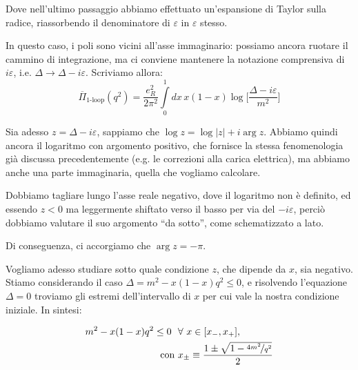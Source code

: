 \documentclass[../main.tex]{subfiles}
\begin{document}
Dove nell'ultimo passaggio abbiamo effettuato un'espansione di Taylor sulla radice, riassorbendo il denominatore di $\varepsilon$ in $\varepsilon$ stesso.

In questo caso, i poli sono vicini all'asse immaginario: possiamo ancora ruotare il cammino di integrazione, ma ci conviene mantenere la notazione comprensiva di \(i\varepsilon\), i.e. \(\Delta \rightarrow \Delta - i\varepsilon\). Scriviamo allora:
\[
\overline\Pi_\text{1-loop}(q^2) = \frac{e_R^2}{2\pi^2}\int\limits_0^1 dx \,x(1-x)\log{\bigg[\frac{\Delta - i\varepsilon}{m^2}\bigg]}
\]

Sia adesso \( z = \Delta - i\varepsilon \), sappiamo che \(\log z = \log|z| + i\arg z\). Abbiamo quindi ancora il logaritmo con argomento positivo, che fornisce la stessa fenomenologia già discussa precedentemente (e.g. le correzioni alla carica elettrica), ma abbiamo anche una parte immaginaria, quella che vogliamo calcolare.

Dobbiamo tagliare lungo l'asse reale negativo, dove il logaritmo non è definito, ed essendo \(z < 0\) ma leggermente shiftato verso il basso per via del \(-i\varepsilon\), perciò dobbiamo valutare il suo argomento “da sotto”, come schematizzato a lato.

Di conseguenza, ci accorgiamo che \(\boxed{\arg z = -\pi}\).

Vogliamo adesso studiare sotto quale condizione $z$, che dipende da $x$, sia negativo. Stiamo considerando il caso \(\Delta = m^2 - x(1-x)q^2\leq 0\), e risolvendo l'equazione \(\Delta = 0\) troviamo gli estremi dell'intervallo di $x$ per cui vale la nostra condizione iniziale. In sintesi:

\begin{align*}
    m^2 - x(1-x)q^2\leq 0 ~~ &\forall ~ x \in [x_-, x_+], \\
    \text{con } &x_\pm \equiv \frac{1\pm\sqrt{1-\nicefrac{4m^2}{q^2}}}{2}
\end{align*}
\end{document}
